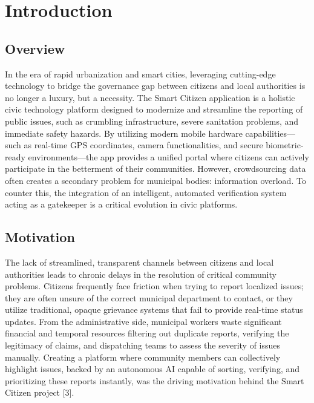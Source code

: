 \documentclass[12pt,a4paper]{report}
\begin{document}

\chapter{Introduction}
\section{Overview}
In the era of rapid urbanization and smart cities, leveraging cutting-edge technology to bridge the governance gap between citizens and local authorities is no longer a luxury, but a necessity. The Smart Citizen application is a holistic civic technology platform designed to modernize and streamline the reporting of public issues, such as crumbling infrastructure, severe sanitation problems, and immediate safety hazards. By utilizing modern mobile hardware capabilities—such as real-time GPS coordinates, camera functionalities, and secure biometric-ready environments—the app provides a unified portal where citizens can actively participate in the betterment of their communities. However, crowdsourcing data often creates a secondary problem for municipal bodies: information overload. To counter this, the integration of an intelligent, automated verification system acting as a gatekeeper is a critical evolution in civic platforms.

\section{Motivation}
The lack of streamlined, transparent channels between citizens and local authorities leads to chronic delays in the resolution of critical community problems. Citizens frequently face friction when trying to report localized issues; they are often unsure of the correct municipal department to contact, or they utilize traditional, opaque grievance systems that fail to provide real-time status updates. From the administrative side, municipal workers waste significant financial and temporal resources filtering out duplicate reports, verifying the legitimacy of claims, and dispatching teams to assess the severity of issues manually. Creating a platform where community members can collectively highlight issues, backed by an autonomous AI capable of sorting, verifying, and prioritizing these reports instantly, was the driving motivation behind the Smart Citizen project [3].
\end{document}
